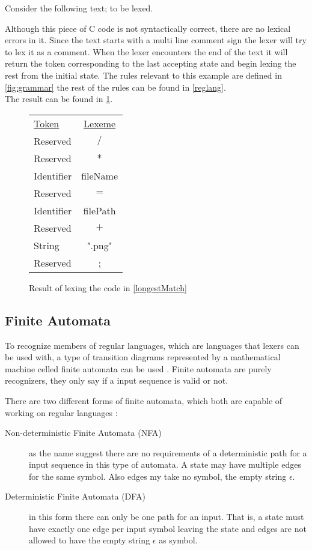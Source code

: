 \begin{example} \label{longestMatch}
Consider the following text; to be lexed.

Although this piece of C code is not syntactically correct, there are no
lexical errors in it. Since
the text starts with a multi line comment sign the lexer will try to lex it as
a comment. When the lexer encounters the end of the text it will return the
token corresponding to the last accepting state and begin lexing the rest from
the initial state. The rules relevant to this example are defined in 
\cref{fig:grammar} the rest of the rules can be found in \cref{reglang}.\\
The result can be found in \cref{fig:longestmatch}.
\end{example}

\begin{figure}[h!]
\begin{center}
\begin{tabular}{l c}
\underline{Token} & \underline{Lexeme}\\
Reserved & $/$\\
Reserved & $*$\\
Identifier &fileName\\
Reserved & $=$\\
Identifier & filePath\\
Reserved & $+$\\
String & ".png"\\
Reserved & ;
\end{tabular}
\end{center}
\caption{Result of lexing the code in \cref{longestMatch} \label{fig:longestmatch}}
\end{figure}


\subsection{Finite Automata}
To recognize members of regular languages, which are languages that lexers can
be used with, a type of transition diagrams
represented by a mathematical machine celled finite automata can be used
\cite{sebesta2012}. Finite automata are purely recognizers, they only say if a
input sequence is valid or not.

There are two different forms of finite automata, which both are capable of
working on regular languages \cite{Aho2006}:
\begin{description}
\item [Non-deterministic Finite Automata (NFA)] as the name suggest there are no
requirements of a deterministic path for a input sequence in this type of
automata. A state may have multiple edges for the same symbol. Also edges my
take no symbol, the empty string $\epsilon$.
\item [Deterministic Finite Automata (DFA)] in this form there can only be one
path for an input. That is, a state must have exactly one edge per input symbol
leaving the state and edges are not allowed to have the empty string $\epsilon$
as symbol.
\end{description}

